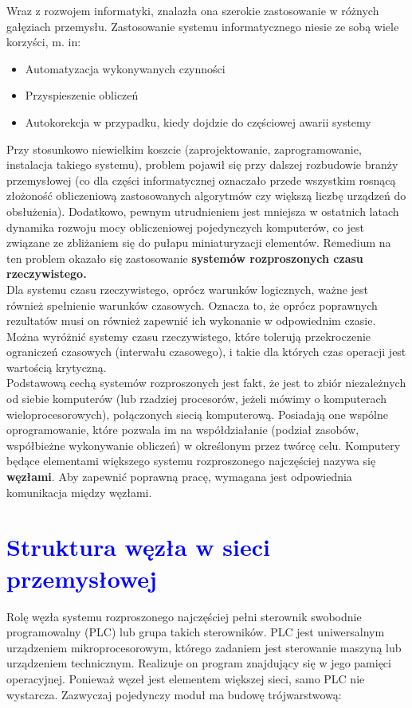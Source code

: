 \documentclass[a4paper,twoside]{article}
\begin{document}
Wraz z rozwojem informatyki, znalazła ona szerokie zastosowanie w różnych gałęziach przemysłu.  Zastosowanie systemu informatycznego niesie ze sobą wiele korzyści, m. in: \\
\begin{itemize}
	\item Automatyzacja wykonywanych czynności \\
	\item Przyspieszenie obliczeń \\
	\item Autokorekcja w przypadku, kiedy dojdzie do częściowej awarii systemy \\
\end{itemize}

Przy stosunkowo niewielkim koszcie (zaprojektowanie, zaprogramowanie, instalacja takiego systemu),   problem pojawił się przy dalszej rozbudowie branży przemysłowej (co dla części informatycznej oznaczało przede wszystkim rosnącą złożoność obliczeniową zastosowanych algorytmów czy większą liczbę urządzeń do obsłużenia). Dodatkowo, pewnym utrudnieniem jest mniejsza w ostatnich latach dynamika rozwoju mocy obliczeniowej pojedynczych komputerów, co jest związane ze zbliżaniem się do pułapu miniaturyzacji elementów. Remedium na ten problem okazało się zastosowanie \textbf{systemów rozproszonych czasu rzeczywistego.} \\

Dla systemu czasu rzeczywistego, oprócz warunków logicznych, ważne jest również spełnienie warunków czasowych. Oznacza to, że oprócz poprawnych rezultatów musi on również zapewnić ich wykonanie w odpowiednim czasie. Można wyróżnić systemy czasu rzeczywistego, które tolerują przekroczenie ograniczeń czasowych (interwału czasowego), i takie dla których czas operacji jest wartością krytyczną. \\

Podstawową cechą systemów rozproszonych jest fakt, że jest to zbiór niezależnych od siebie komputerów (lub rzadziej procesorów, jeżeli mówimy o komputerach wieloprocesorowych), połączonych siecią komputerową. Posiadają one wspólne oprogramowanie, które pozwala im na współdziałanie (podział zasobów, współbieżne wykonywanie obliczeń) w określonym przez twórcę celu. Komputery będące elementami większego systemu rozproszonego najczęściej nazywa się \textbf{węzłami}. Aby zapewnić poprawną pracę, wymagana jest odpowiednia komunikacja między węzłami.

\section{\textcolor{blue}{Struktura węzła w sieci przemysłowej}}
Rolę węzła systemu rozproszonego najczęściej pełni sterownik swobodnie programowalny (PLC) lub grupa takich sterowników. PLC jest uniwersalnym urządzeniem mikroprocesorowym, którego zadaniem jest sterowanie maszyną lub urządzeniem technicznym. Realizuje on program znajdujący się w jego pamięci operacyjnej. Ponieważ węzeł jest elementem większej sieci, samo PLC nie wystarcza. Zazwyczaj pojedynczy moduł ma budowę trójwarstwową: \\
\end{document}
